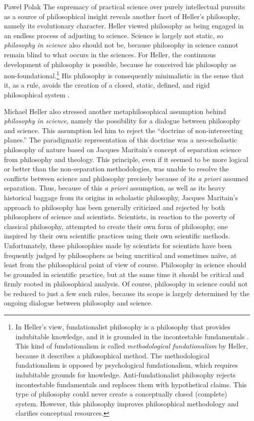 \begin{artengenv}{Paweł Polak}
The supremacy of practical science over purely intellectual pursuits as a source of philosophical insight reveals
another facet of Heller’s philosophy, namely its evolutionary character. Heller viewed philosophy as being engaged in
an endless process of adjusting to science. Science is largely not static, so \textit{philosophy in science }also
should not be, because philosophy in science cannot remain blind to what occurs in the sciences. For Heller, the
continuous development of philosophy is possible, because he conceived his philosophy as non-foundational.\footnote{In
Heller’s view, fundationalist philosophy is a philosophy that provides indubitable knowledge, and it is grounded in the
incontestable fundamentals
\parencite{pol_heller_nauki_2006}.
This kind of fundationalism is called \textit{methodological fundationalism
}by Heller, because it describes a philosophical method. The methodological fundationalism is opposed by psychological
fundationalism, which requires indubitable grounds for knowledge. Anti-fundationalist philosophy rejects incontestable
fundamentals and replaces them with hypothetical claims. This type of philosophy could never create a conceptually
closed (complete) system. However, this philosophy improves philosophical methodology and clarifies conceptual
resources.} His philosophy is consequently minimalistic in the sense that it, as a rule, avoids the creation of a
closed, static, defined, and rigid philosophical system
\parencite[p.34]{pol_heller_przeciw_2006}.

Michael Heller also stressed another metaphilosophical assumption behind \textit{philosophy in science}, namely the
possibility for a dialogue between philosophy and science. This assumption led him to reject the ``doctrine of
non-intersecting planes.'' The paradigmatic representation of this doctrine was a neo-scholastic philosophy of nature
based on Jacques Maritain’s concept of separation science from philosophy and theology. This principle, even if it
seemed to be more logical or better than the non-separation methodologies, was unable to resolve the conflicts between
science and philosophy precisely because of its \textit{a priori} assumed separation. Thus, because of this\textit{ a
priori} assumption, as well as its heavy historical baggage from its origins in scholastic philosophy, Jacques
Maritain’s approach to philosophy has been generally criticized and rejected by both philosophers of science and
scientists. Scientists, in reaction to the poverty of classical philosophy, attempted to create their own form of
philosophy, one inspired by their own scientific practices using their own scientific methods. Unfortunately, these
philosophies made by scientists for scientists have been frequently judged by philosophers as being uncritical and
sometimes naïve, at least from the philosophical point of view of course. Philosophy in science should be grounded in
scientific practice, but at the same time it should be critical and firmly rooted in philosophical analysis. Of course,
philosophy in science could not be reduced to just a few such rules, because its scope is largely determined by the
ongoing dialogue between philosophy and science. 


\end{artengenv}
